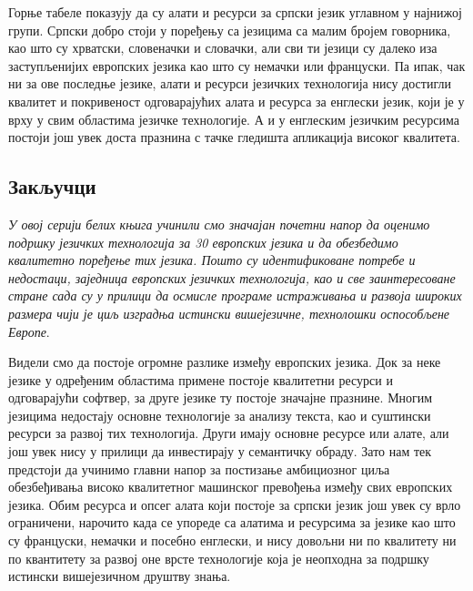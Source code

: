 \begin{multicols}{2}
Горње табеле показују да су алати и ресурси за српски језик углавном у најнижој групи. Српски добро стоји у поређењу са језицима са малим бројем говорника, као што су хрватски, словеначки и словачки, али сви ти језици су далеко иза заступљенијих европских језика као што су немачки или француски. Па ипак, чак ни за ове последње језике, алати и ресурси  језичких технологија нису достигли квалитет и покривеност одговарајућих алата и ресурса за енглески језик, који је у врху у свим областима језичке технологије. А и у енглеским језичким ресурсима постоји још увек доста празнина с тачке гледишта апликација високог квалитета.



 \subsection {Закључци}
   
\textit{У овој серији белих књига учинили смо значајан почетни напор да оценимо подршку језичких технологија за 30 европских језика и да обезбедимо квалитетно поређење тих језика. Пошто су идентификоване потребе и недостаци, заједница европских језичких технологија, као и све заинтересоване стране сада су у прилици да осмисле програме истраживања и развоја широких размера чији је циљ изградња истински вишејезичне,  технолошки оспособљене Европе}.

Видели смо да постоје огромне разлике између европских језика. Док за неке језике у одређеним областима примене постоје квалитетни ресурси и  одговарајући софтвер, за друге језике ту постоје значајне празнине. Многим језицима недостају основне технологије за анализу текста, као и суштински ресурси за развој тих технологија. Други имају основне ресурсе или алате, али још увек нису у прилици да инвестирају у семантичку обраду. Зато нам тек предстоји да учинимо главни напор за постизање амбициозног циља обезбеђивања високо квалитетног машинског превођења између свих европских језика.  
Обим ресурса и опсег алата који постоје за српски језик још увек су врло ограничени, нарочито када се упореде са алатима и ресурсима за језике као што су француски, немачки и посебно енглески, и нису довољни ни по квалитету ни по квантитету за развој оне врсте технологије која је неопходна за подршку истински вишејезичном друштву знања. 


\end{multicols}

